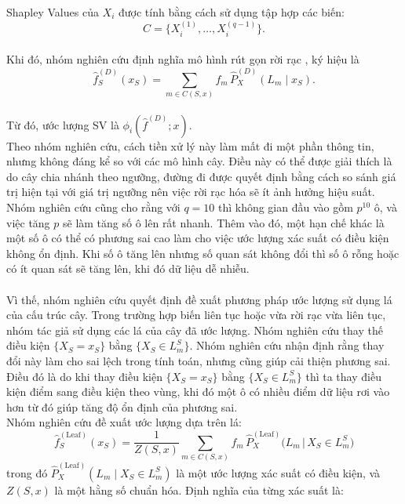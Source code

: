 \documentclass[12pt, a4paper]{article}
\theoremstyle{plain}
\theoremstyle{proposition}
\theoremstyle{lemma}
\begin{document}
Shapley Values của $X_i$ được tính bằng cách sử dụng 
tập hợp các biến:
\[
C = \{ X_i^{(1)}, \ldots, X_i^{(q-1)} \}.
\]  \\
Khi đó, nhóm nghiên cứu định nghĩa mô hình rút gọn rời rạc , ký hiệu là
\[
\hat{f}_S^{(D)}(x_S) = \sum_{m \in C(S, x)} f_m \, \hat{P}_X^{(D)}(L_m \mid x_S). \tag{11}
\] \\
Từ đó, ước lượng SV là 
\(
\phi_i(\hat{f}^{(D)}; x).
\) \\
Theo nhóm nghiên cứu, cách tiền xử lý này làm mất đi một phần thông tin, nhưng không đáng kể so với các mô hình cây. Điều này có thể được giải thích là do cây chia nhánh theo ngưỡng, đường đi được quyết định bằng cách so sánh giá trị hiện tại với giá trị ngưỡng nên việc rời rạc hóa sẽ ít ảnh hưởng hiệu suất. Nhóm nghiên cứu cũng cho rằng với $q=10$ thì không gian đầu vào gồm $p^{10}$ ô, và việc tăng $p$ sẽ làm tăng số ô lên rất nhanh. Thêm vào đó, một hạn chế khác là một số ô có thể có phương sai cao làm cho việc ước lượng xác suất có điều kiện không ổn định. Khi số ô tăng lên nhưng số quan sát không đổi thì số ô rỗng hoặc có ít quan sát sẽ tăng lên, khi đó dữ liệu dễ nhiễu. \\\\
Vì thế, nhóm nghiên cứu quyết định đề xuất phương pháp ước lượng sử dụng lá của cấu trúc cây. Trong trường hợp biến liên tục hoặc vừa rời rạc vừa liên tục, nhóm tác giả sử dụng các lá của cây đã ước lượng. Nhóm nghiên cứu thay thế điều kiện 
\(\{X_S = x_S\}\) bằng \(\{X_S \in L^S_m\}\). Nhóm nghiên cứu nhận định rằng thay đổi này làm cho sai lệch trong tính toán, nhưng cũng giúp cải thiện phương sai. Điều đó là do khi thay điều kiện \(\{X_S = x_S\}\) bằng \(\{X_S \in L^S_m\}\) thì ta thay điều kiện điểm sang điều kiện theo vùng, khi đó một ô có nhiều điểm dữ liệu rơi vào hơn từ đó giúp tăng độ ổn định của phương sai. \\
Nhóm nghiên cứu đề xuất ước lượng dựa trên lá:
\[
\hat{f}^{(\text{Leaf})}_S(x_S) = \frac{1}{Z(S,x)} 
\sum_{m \in C(S,x)} f_m \, \hat{P}^{(\text{Leaf})}_X\!\Big(L_m \,\big|\, X_S \in L^S_m \Big)
\]
trong đó \(\hat{P}^{(\text{Leaf})}_X(L_m \mid X_S \in L^S_m)\) là một ước lượng xác suất có điều kiện, 
và \(Z(S,x)\) là một hằng số chuẩn hóa.
Định nghĩa của từng xác suất là:
\end{document}
